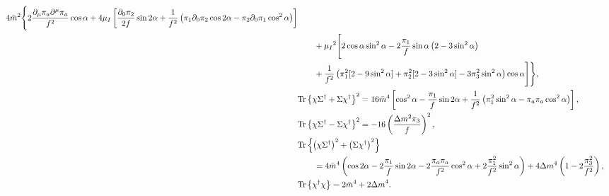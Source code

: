 \begin{align}
    4\bar m^2
    \Bigg\{
        2 \frac{\partial_\mu \pi_a \partial^\mu \pi_a}{f^2} \cos{\alpha}
        + 4 \mu_I 
        \left[
            \frac{\partial_0 \pi_2}{2 f} \sin{2\alpha}
            + \frac{1}{f^2}
            \left(
                \pi_1 \partial_0 \pi_2 \cos{2\alpha}
                - \pi_2 \partial_0 \pi_1\cos^2{\alpha}
            \right)
        \right]
        \\\notag& \quad \quad + \mu_I{}^2
        \Bigg[
            2\cos{\alpha}\sin^2{\alpha} 
            - 2 \frac{\pi_1}{f} \sin{\alpha}
            \left(2 - 3\sin^2{\alpha}\right) 
            \\ &\quad\quad
            + \frac{1}{f^2}
            \left(                
                \pi_1^2[2 - 9 \sin^2{\alpha}]
                + \pi_2^2 [2 - 3 \sin^2{\alpha}]
                - 3\pi_3^2\sin^2{\alpha}
            \right)
            \cos{\alpha}
        \Bigg]
    \Bigg\}, \label{l4}\\
    \label{l3}
    & \text{Tr} \left\{ \chi \Sigma^\dagger + \Sigma \chi^\dagger  \right\}^2
    = 16 \bar m^4
    \left[
        \cos^2{\alpha} 
        - \frac{\pi_1}{f} \sin{2\alpha}
        + \frac{1}{f^2}\left(\pi_1^2 \sin^2{\alpha} - \pi_a \pi_a \cos^2{\alpha}\right)
    \right], \\
    \label{l7}
    & \text{Tr} \left\{ \chi \Sigma^\dagger - \Sigma \chi^\dagger  \right\}^2
     = - 16 \left( \frac{\Delta m^2 \pi_3}{f} \right)^2, \\
    \notag
    & \text{Tr} \left\{ \left(\chi \Sigma^\dagger\right)^2 + \left(\Sigma \chi^\dagger \right)^2 \right\}
    \\\label{h3}
    & \quad \quad = 4 \bar m^4
    \left(
        \cos{2\alpha} 
        - 2\frac{\pi_1}{f} \sin{2\alpha}
        - 2\frac{\pi_a \pi_a}{f^2} \cos^2{\alpha}
        + 2\frac{\pi_1^2}{f^2} \sin^2{\alpha}
    \right)
    + 4 \Delta m^4
    \left(
        1- 2\frac{ \pi_3^2}{f^2}
    \right)
    , \\
    \label{h2}
    & \text{Tr} \left\{ \chi^\dagger \chi \right\} = 2 {\bar m}^4 + 2{\Delta m}^4.
\end{align}
%

\endgroup

